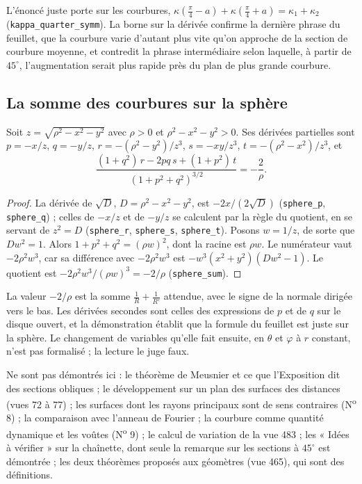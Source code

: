 \begin{remarque}
L'énoncé juste porte sur les courbures, $\kappa(\frac\pi4 - a) + \kappa(\frac\pi4 + a) = \kappa_1 + \kappa_2$ (\texttt{kappa\_quarter\_symm}). La borne sur la dérivée confirme la dernière phrase du feuillet, que la courbure varie d'autant plus vite qu'on approche de la section de courbure moyenne, et contredit la phrase intermédiaire selon laquelle, à partir de $45^\circ$, l'augmentation serait plus rapide près du plan de plus grande courbure.
\end{remarque}

\subsection*{La somme des courbures sur la sphère}

\begin{enonce}
Soit $z = \sqrt{\rho^2 - x^2 - y^2}$ avec $\rho > 0$ et $\rho^2 - x^2 - y^2 > 0$. Ses dérivées partielles sont $p = -x/z$, $q = -y/z$, $r = -(\rho^2 - y^2)/z^3$, $s = -xy/z^3$, $t = -(\rho^2 - x^2)/z^3$, et
\[
\frac{(1+q^2)\,r - 2pq\,s + (1+p^2)\,t}{(1+p^2+q^2)^{3/2}} = -\frac2\rho .
\]
\end{enonce}

\begin{proof}
La dérivée de $\sqrt{D}$, $D = \rho^2 - x^2 - y^2$, est $-2x/(2\sqrt D)$ (\texttt{sphere\_p}, \texttt{sphere\_q}) ; celles de $-x/z$ et de $-y/z$ se calculent par la règle du quotient, en se servant de $z^2 = D$ (\texttt{sphere\_r}, \texttt{sphere\_s}, \texttt{sphere\_t}). Posons $w = 1/z$, de sorte que $Dw^2 = 1$. Alors $1 + p^2 + q^2 = (\rho w)^2$, dont la racine est $\rho w$. Le numérateur vaut $-2\rho^2w^3$, car sa différence avec $-2\rho^2w^3$ est $-w^3(x^2+y^2)(Dw^2 - 1)$. Le quotient est $-2\rho^2w^3/(\rho w)^3 = -2/\rho$ (\texttt{sphere\_sum}).
\end{proof}

\begin{remarque}
La valeur $-2/\rho$ est la somme $\frac1R + \frac1{R'}$ attendue, avec le signe de la normale dirigée vers le bas. Les dérivées secondes sont celles des expressions de $p$ et de $q$ sur le disque ouvert, et la démonstration établit que la formule du feuillet est juste sur la sphère. Le changement de variables qu'elle fait ensuite, en $\theta$ et $\varphi$ à $r$ constant, n'est pas formalisé ; la lecture le juge faux.
\end{remarque}

Ne sont pas démontrés ici : le théorème de Meusnier et ce que l'Exposition dit des sections obliques ; le développement sur un plan des surfaces des distances (vues 72 à 77) ; les surfaces dont les rayons principaux sont de sens contraires (N\textsuperscript{o} 8) ; la comparaison avec l'anneau de Fourier ; la courbure comme quantité dynamique et les voûtes (N\textsuperscript{o} 9) ; le calcul de variation de la vue 483 ; les « Idées à vérifier » sur la chaînette, dont seule la remarque sur les sections à $45^\circ$ est démontrée ; les deux théorèmes proposés aux géomètres (vue 465), qui sont des définitions.
